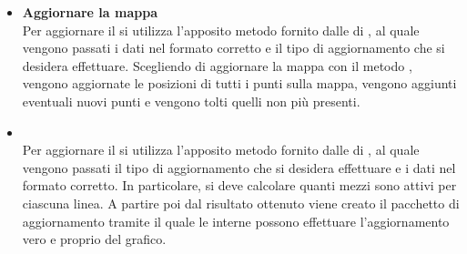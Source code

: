 \begin{itemize}
            \item \textbf{Aggiornare la mappa} \\
            Per aggiornare il  si utilizza l'apposito metodo fornito dalle  di , al quale vengono passati i dati nel formato corretto e il tipo di aggiornamento che si desidera effettuare. Scegliendo di aggiornare la mappa con il metodo , vengono aggiornate le posizioni di tutti i punti sulla mappa, vengono aggiunti eventuali nuovi punti e vengono tolti quelli non più presenti.
            
            
            \item {} \\
            Per aggiornare il  si utilizza l'apposito metodo fornito dalle  di , al quale vengono passati il tipo di aggiornamento che si desidera effettuare e i dati nel formato corretto. In particolare, si deve calcolare quanti mezzi sono attivi per ciascuna linea. A partire poi dal risultato ottenuto viene creato il pacchetto di aggiornamento tramite il quale le  interne possono effettuare l'aggiornamento vero e proprio del grafico.

        \end{itemize}
